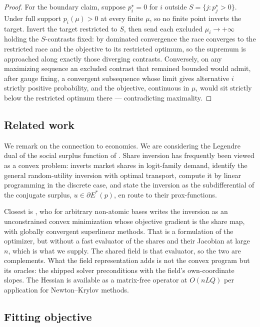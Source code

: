 \documentclass[11pt]{article}
\begin{document}
\begin{proof}
For the boundary claim, suppose $p^{\star}_i=0$ for $i$ outside
$S=\{j:p^{\star}_j>0\}$. Under full support $p_i(\mu)>0$ at every finite
$\mu$, so no finite point inverts the target. Invert the target
restricted to $S$, then send each excluded $\mu_i\to+\infty$ holding the
$S$-contrasts fixed: by dominated convergence the race converges to the
restricted race and the objective to its restricted optimum, so the
supremum is approached along exactly those diverging contrasts.
Conversely, on any maximizing sequence an excluded contrast that
remained bounded would admit, after gauge fixing, a convergent
subsequence whose limit gives alternative $i$ strictly positive
probability, and the objective, continuous in $\mu$, would sit strictly
below the restricted optimum there --- contradicting maximality.
\end{proof}

\subsection{Related work}

We remark on the connection to economics. We are considering the Legendre dual of the social surplus function of
\citet{mcfadden1981}. Share inversion has frequently been viewed as a convex problem: \citet{berry1994} inverts market shares in
logit-family demand, \citet{galichon2022} identify the general random-utility
inversion with optimal transport, \citet{chiong2016} compute it by
linear programming in the discrete case, and \citet{muller2022} state
the inversion as the subdifferential of the conjugate surplus,
$u\in\partial E^{*}(p)$, en route to their prox-functions.

Closest is
\citet{li2018}, who for arbitrary non-atomic bases writes the inversion
as an unconstrained convex minimization whose objective gradient is the
share map, with globally convergent superlinear methods. That is a formulation
of the optimizer, but without a fast evaluator of the shares
and their Jacobian at large $n$, which is what we supply. The shared field is that evaluator, so
the two are complements. What the field representation adds is not the
convex program but its oracles: the shipped solver preconditions with
the field's own-coordinate slopes. The Hessian is available as a matrix-free operator at $O(nLQ)$ per application for Newton--Krylov methods.

\subsection{Fitting objective}
\end{document}
